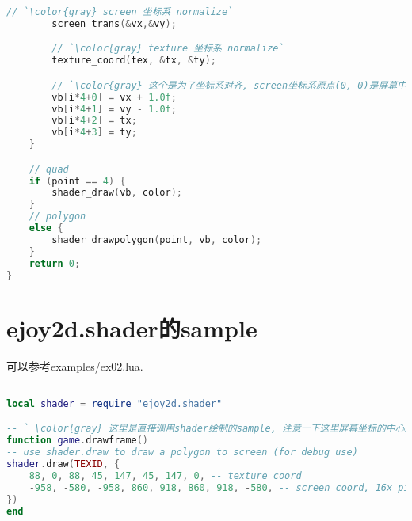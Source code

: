 {\begin{lstlisting}[language=C]
        // `\color{gray} screen 坐标系 normalize`
        screen_trans(&vx,&vy);

        // `\color{gray} texture 坐标系 normalize`
        texture_coord(tex, &tx, &ty);

        // `\color{gray} 这个是为了坐标系对齐, screen坐标系原点(0, 0)是屏幕中间, 现在调整到左下角`
        vb[i*4+0] = vx + 1.0f;
        vb[i*4+1] = vy - 1.0f;
        vb[i*4+2] = tx;
        vb[i*4+3] = ty;
    }

    // quad
    if (point == 4) {
        shader_draw(vb, color);
    }
    // polygon
    else {
        shader_drawpolygon(point, vb, color);
    }
    return 0;
}
\end{lstlisting}
}

\section {\ZHH ejoy2d.shader的sample} {
    {可以参考examples/ex02.lua. }\par
\begin{lstlisting}[language=lua]

local shader = require "ejoy2d.shader"

-- ` \color{gray} 这里是直接调用shader绘制的sample, 注意一下这里屏幕坐标的中心原点`
function game.drawframe()
-- use shader.draw to draw a polygon to screen (for debug use)
shader.draw(TEXID, {
    88, 0, 88, 45, 147, 45, 147, 0,	-- texture coord
    -958, -580, -958, 860, 918, 860, 918, -580, -- screen coord, 16x pixel, (0,0) is the center of screen
})
end

\end{lstlisting}
}


